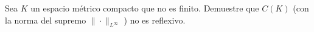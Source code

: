  Sea $K$ un espacio métrico compacto que no es finito. Demuestre que $C(K)$ (con la norma del supremo $\|\cdot\|_{L^{\infty}}$ ) no es reflexivo.